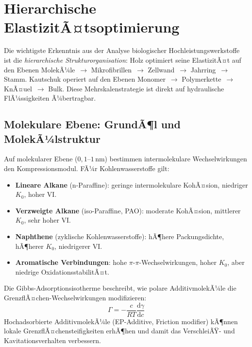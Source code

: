﻿\documentclass[a4paper,12pt]{scrreprt}
\theoremstyle{definition}
\begin{document}
\section{Hierarchische ElastizitÃ¤tsoptimierung}

Die wichtigste Erkenntnis aus der Analyse biologischer Hochleistungswerkstoffe
ist die \emph{hierarchische Strukturorganisation}: Holz optimiert seine
ElastizitÃ¤t auf den Ebenen MolekÃ¼le~$\to$ Mikrofibrillen~$\to$ Zellwand~$\to$
Jahrring~$\to$ Stamm. Kautschuk operiert auf den Ebenen Monomer~$\to$
Polymerkette~$\to$ KnÃ¤uel~$\to$ Bulk. Diese Mehrskalenstrategie ist direkt
auf hydraulische FlÃ¼ssigkeiten Ã¼bertragbar.

\subsection{Molekulare Ebene: GrundÃ¶l und MolekÃ¼lstruktur}

Auf molekularer Ebene ($0{,}1$--$1\,\mathrm{nm}$) bestimmen
intermolekulare Wechselwirkungen den Kompressionsmodul. FÃ¼r
Kohlenwasserstoffe gilt:

\begin{itemize}
  \item \textbf{Lineare Alkane} (n-Paraffine): geringe intermolekulare
    KohÃ¤sion, niedriger $K_0$, hoher VI.
  \item \textbf{Verzweigte Alkane} (iso-Paraffine, PAO): moderate KohÃ¤sion,
    mittlerer $K_0$, sehr hoher VI.
  \item \textbf{Naphthene} (zyklische Kohlenwasserstoffe): hÃ¶here Packungsdichte,
    hÃ¶herer $K_0$, niedrigerer VI.
  \item \textbf{Aromatische Verbindungen}: hohe $\pi$-$\pi$-Wechselwirkungen,
    hoher $K_0$, aber niedrige OxidationsstabilitÃ¤t.
\end{itemize}

Die Gibbs-Adsorptionsisotherme beschreibt, wie polare AdditivmolekÃ¼le
die GrenzflÃ¤chen-Wechselwirkungen modifizieren:
\begin{equation}
  \Gamma = -\frac{c}{RT} \frac{\mathrm{d}\gamma}{\mathrm{d}c}
  \label{eq:gibbs_adsorption}
\end{equation}
Hochadsorbierte AdditivmolekÃ¼le (EP-Additive, Friction modifier) kÃ¶nnen
lokale GrenzflÃ¤chensteifigkeiten erhÃ¶hen und damit das VerschleiÃŸ- und
Kavitationsverhalten verbessern.
\end{document}
